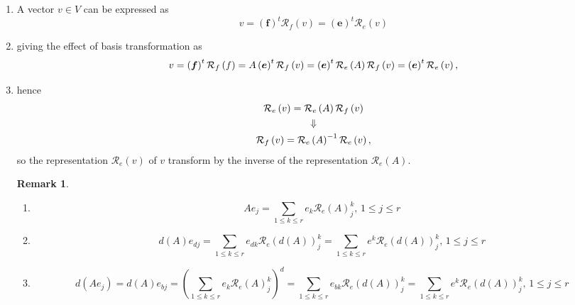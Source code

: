 \documentclass[aps,preprint]{revtex4}
\newtheorem{remark}[theorem]{Remark}
\begin{document}
\begin{enumerate}
\begin{enumerate}
\item A vector $v\in V$ can be expressed as 
\begin{equation}
v=\left( \boldsymbol{f}\right) ^{t}\mathcal{R}_{f}\left( v\right) =\left( 
\boldsymbol{e}\right) ^{t}\mathcal{R}_{e}\left( v\right)
\end{equation}

\item giving the effect of basis transformation as 
\begin{equation}
v=\left( \boldsymbol{f}\right) ^{t}\mathcal{R}_{f}\left( f\right) =A\left( 
\boldsymbol{e}\right) ^{t}\mathcal{R}_{f}\left( v\right) =\left( \boldsymbol{%
e}\right) ^{t}\mathcal{R}_{e}\left( A\right) \mathcal{R}_{f}\left( v\right)
=\left( \boldsymbol{e}\right) ^{t}\mathcal{R}_{e}\left( v\right) ,
\end{equation}

\item hence%
\begin{gather}
\mathcal{R}_{e}\left( v\right) =\mathcal{R}_{e}\left( A\right) \mathcal{R}%
_{f}\left( v\right) \\
\Downarrow \\
\mathcal{R}_{f}\left( v\right) =\mathcal{R}_{e}\left( A\right) ^{-1}\mathcal{%
R}_{e}\left( v\right) ,
\end{gather}%
so the representation $\mathcal{R}_{e}\left( v\right) $ of $v$ transform by
the inverse of the representation $\mathcal{R}_{e}\left( A\right) .$

\begin{remark}
\begin{enumerate}
\item 
\begin{equation}
Ae_{j}=\sum_{1\leq k\leq r}e_{k}\mathcal{R}_{e}\left( A\right)
_{j}^{k},\,1\leq j\leq r
\end{equation}

\item 
\begin{equation}
d\left( A\right) e_{dj}=\sum_{1\leq k\leq r}e_{dk}\mathcal{R}_{e}\left(
d\left( A\right) \right) _{j}^{k}=\sum_{1\leq k\leq r}e^{k}\mathcal{R}%
_{e}\left( d\left( A\right) \right) _{j}^{k},\,1\leq j\leq r
\end{equation}

\item 
\begin{equation}
d\left( Ae_{j}\right) =d\left( A\right) e_{bj}=\left( \sum_{1\leq k\leq
r}e_{k}\mathcal{R}_{e}\left( A\right) _{j}^{k}\right) ^{d}=\sum_{1\leq k\leq
r}e_{bk}\mathcal{R}_{e}\left( d\left( A\right) \right) _{j}^{k}=\sum_{1\leq
k\leq r}e^{k}\mathcal{R}_{e}\left( d\left( A\right) \right) _{j}^{k},\,1\leq
j\leq r
\end{equation}


\end{enumerate}
\end{remark}
\end{enumerate}
\end{enumerate}
\end{document}

